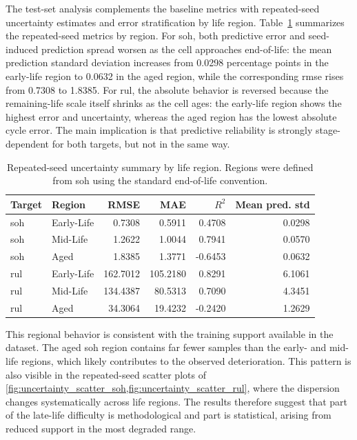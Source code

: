The test-set analysis complements the baseline metrics with repeated-seed uncertainty estimates and error stratification by life region. Table~\cref{tab:uncertainty_by_region} summarizes the repeated-seed metrics by region. For \ac{soh}, both predictive error and seed-induced prediction spread worsen as the cell approaches end-of-life: the mean prediction standard deviation increases from 0.0298 percentage points in the early-life region to 0.0632 in the aged region, while the corresponding \ac{rmse} rises from 0.7308 to 1.8385. For \ac{rul}, the absolute behavior is reversed because the remaining-life scale itself shrinks as the cell ages: the early-life region shows the highest error and uncertainty, whereas the aged region has the lowest absolute cycle error. The main implication is that predictive reliability is strongly stage-dependent for both targets, but not in the same way.

\begin{table}[H]
    \centering
    \caption{Repeated-seed uncertainty summary by life region. Regions were defined from \ac{soh} using the standard end-of-life convention.}
    \label{tab:uncertainty_by_region}
    \begin{tabular}{llrrrr}
    \toprule
    Target & Region & RMSE & MAE & $R^2$ & Mean pred. std \\
    \midrule
    \ac{soh} & Early-Life & 0.7308 & 0.5911 & 0.4708 & 0.0298 \\
    \ac{soh} & Mid-Life & 1.2622 & 1.0044 & 0.7941 & 0.0570 \\
    \ac{soh} & Aged & 1.8385 & 1.3771 & -0.6453 & 0.0632 \\
    \ac{rul} & Early-Life & 162.7012 & 105.2180 & 0.8291 & 6.1061 \\
    \ac{rul} & Mid-Life & 134.4387 & 80.5313 & 0.7090 & 4.3451 \\
    \ac{rul} & Aged & 34.3064 & 19.4232 & -0.2420 & 1.2629 \\
    \bottomrule
    \end{tabular}
\end{table}

This regional behavior is consistent with the training support available in the dataset. The aged \ac{soh} region contains far fewer samples than the early- and mid-life regions, which likely contributes to the observed deterioration. This pattern is also visible in the repeated-seed scatter plots of \cref{fig:uncertainty_scatter_soh,fig:uncertainty_scatter_rul}, where the dispersion changes systematically across life regions. The results therefore suggest that part of the late-life difficulty is methodological and part is statistical, arising from reduced support in the most degraded range.

